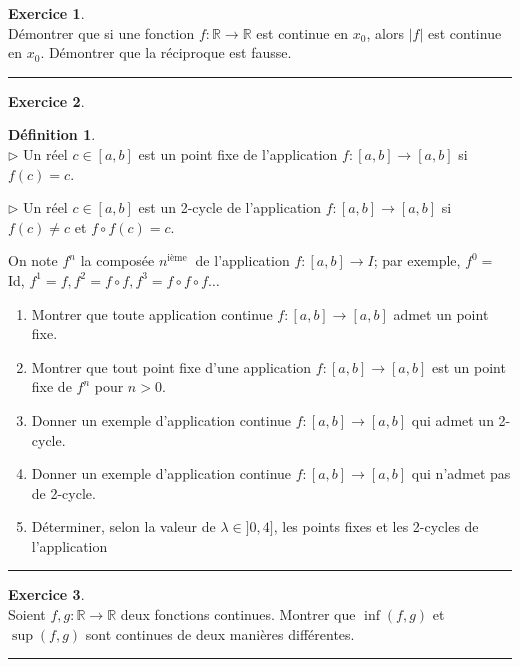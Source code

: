 \documentclass[a4paper,11pt]{article}
\theoremstyle{definition}
\newtheorem{defi}{Définition}
\newtheorem{exo}{Exercice} %
\begin{document}
\begin{exo}\textit{}\quad\\[0.25cm]
	Démontrer que si une fonction $f:\mathbb R\to\mathbb R$ est continue en $x_0$, alors $|f|$ est continue en $x_0$. Démontrer que la réciproque est fausse.
	
	
	\centering
	\rule{1\linewidth}{0.6pt}
\end{exo}


\begin{exo}\textit{}\quad\\[0.25cm]

	\begin{defi}\textit{}\quad\\
		$\triangleright$ Un réel $c \in[a, b]$ est un point fixe de l'application $f:[a, b] \rightarrow[a, b]$ si $f(c)=c$.
		
		$\triangleright$ Un réel $c \in[a, b]$ est un 2-cycle de l'application $f:[a, b] \rightarrow[a, b]$ si $f(c) \neq c$ et $f \circ f(c)=c$.
	\end{defi}
 On note $f^{n}$ la composée $n^{\text {ième }}$ de l'application $f:[a, b] \rightarrow I$; par exemple, $f^{0}=$ Id, $f^{1}=f, f^{2}=f \circ f, f^{3}=f \circ f \circ f \ldots$
 
 \begin{enumerate}
	\item Montrer que toute application continue $f:[a, b] \rightarrow[a, b]$ admet un point fixe.
 	\item Montrer que tout point fixe d'une application $f:[a, b] \rightarrow[a, b]$ est un point fixe de $f^{n}$ pour $n>0$.
 	\item Donner un exemple d'application continue $f:[a, b] \rightarrow[a, b]$ qui admet un 2-cycle.
 	\item Donner un exemple d'application continue $f:[a, b] \rightarrow[a, b]$ qui n'admet pas de 2-cycle.
 	\item Déterminer, selon la valeur de $\lambda \in] 0,4]$, les points fixes et les 2-cycles de l'application
 
 \end{enumerate}
	
	\centering
	\rule{1\linewidth}{0.6pt}
\end{exo}

\begin{exo}\textit{}\quad\\[0.25cm]
	Soient $f,g:\mathbb R\to\mathbb R$ deux fonctions continues.
	Montrer que $\inf(f,g)$ et $\sup(f,g)$ sont continues de deux manières différentes.
	
	
	\centering
	\rule{1\linewidth}{0.6pt}
\end{exo}
\end{document}
